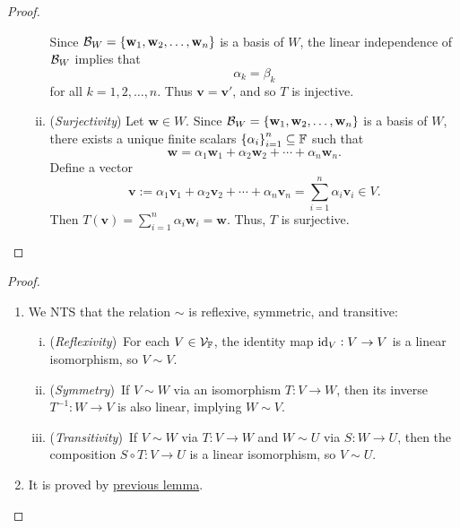 \documentclass[11pt,openany]{article}
\renewcommand{\vec}[1]{\mathbf{#1}}
\begin{document}
\begin{proof}
\begin{enumerate}[]
\begin{enumerate}[(i)]
\[		\] Since $\basis_W=\set{\vec{w}_1,\vec{w}_2,\dots,\vec{w}_n}$ is a basis of $W$, the linear independence of $\mathcal{B}_W$ implies that\[
		\alpha_k=\beta_k
		\] for all $k=1,2,\dots,n$. Thus $\vec{v}=\vec{v}'$, and so $T$ is injective. 
		\newpage
		\item (\textit{Surjectivity}) Let $\vec{w}\in W$. Since $\basis_W=\set{\vec{w}_1,\vec{w}_2,\dots,\vec{w}_n}$ is a basis of $W$, there exists a unique finite scalars $\set{\alpha_i}_{i=1}^n\subseteq \mathbb{F}$ such that \[
		\vec{w}=\alpha_1\vec{w}_1+\alpha_2\vec{w}_2+\cdots+\alpha_n\vec{w}_n.
		\] Define a vector \[
		\vec{v}:=\alpha_1\vec{v}_1+\alpha_2\vec{v}_2+\cdots+\alpha_n\vec{v}_n=\sum_{i=1}^n\alpha_i\vec{v}_i\in V.
		\] Then $T(\vec{v})=\sum_{i=1}^n\alpha_i\vec{w}_i=\vec{w}$. Thus, $T$ is surjective.
	\end{enumerate}
\end{enumerate}
\end{proof}
\begin{proof}
\ \begin{enumerate}[(1)]
	\item We NTS that the relation $\sim$ is reflexive, symmetric, and transitive: \begin{enumerate}[(i)]
		\item (\textit{Reflexivity})\ For each $V\in\mathcal{V}_{\mathbb{F}}$, the identity map $\textnormal{id}_V:V\to V$ is a linear isomorphism, so $V\sim V$.
		\item (\textit{Symmetry})\ If $V\sim W$ via an isomorphism $T:V\to W$, then its inverse $T^{-1}:W\to V$ is also linear, implying $W\sim V$.
		\item (\textit{Transitivity})\ If $V\sim W$ via $T:V\to W$ and $W\sim U$ via $S:W\to U$, then the composition $S\circ T:V\to U$ is a linear isomorphism, so $V\sim U$.
	\end{enumerate}
	\item It is proved by \hyperlink{prop}{previous lemma}.
\end{enumerate}
\end{proof}
\end{document}
